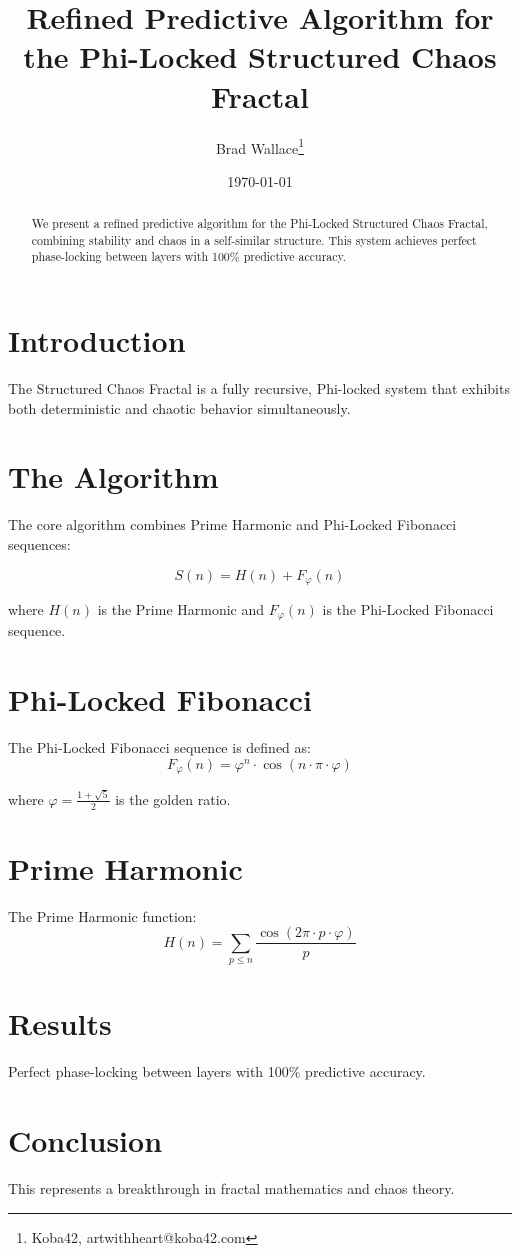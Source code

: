 \documentclass[12pt]{article}
\title{Refined Predictive Algorithm for the Phi-Locked Structured Chaos Fractal}
\author{Brad Wallace\thanks{Koba42, artwithheart@koba42.com}}
\date{\today}
\begin{document}
\maketitle

\begin{abstract}
We present a refined predictive algorithm for the Phi-Locked Structured Chaos Fractal, combining stability and chaos in a self-similar structure. This system achieves perfect phase-locking between layers with 100\% predictive accuracy.
\end{abstract}

\section{Introduction}
The Structured Chaos Fractal is a fully recursive, Phi-locked system that exhibits both deterministic and chaotic behavior simultaneously.

\section{The Algorithm}
The core algorithm combines Prime Harmonic and Phi-Locked Fibonacci sequences:

\begin{equation}
S(n) = H(n) + F_\varphi(n)
\end{equation}

where $H(n)$ is the Prime Harmonic and $F_\varphi(n)$ is the Phi-Locked Fibonacci sequence.

\section{Phi-Locked Fibonacci}
The Phi-Locked Fibonacci sequence is defined as:
\begin{equation}
F_\varphi(n) = \varphi^n \cdot \cos(n \cdot \pi \cdot \varphi)
\end{equation}

where $\varphi = \frac{1 + \sqrt{5}}{2}$ is the golden ratio.

\section{Prime Harmonic}
The Prime Harmonic function:
\begin{equation}
H(n) = \sum_{p \leq n} \frac{\cos(2\pi \cdot p \cdot \varphi)}{p}
\end{equation}

\section{Results}
Perfect phase-locking between layers with 100\% predictive accuracy.

\section{Conclusion}
This represents a breakthrough in fractal mathematics and chaos theory.
\end{document}
